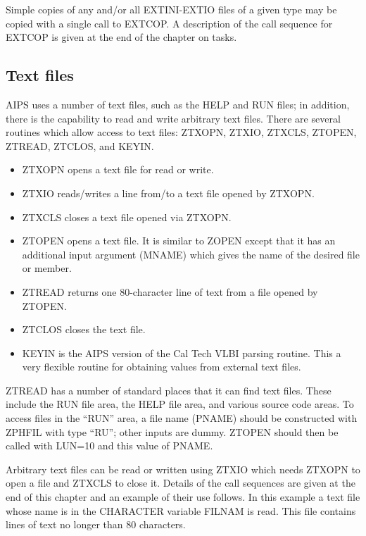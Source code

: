 Simple copies of any and/or all EXTINI-EXTIO files of a given type may
be copied with a single call to EXTCOP.  A description of the call
sequence for EXTCOP is given at the end of the chapter on tasks.


\subsection{Text files}
AIPS uses a number of text files, such as the HELP and RUN files; in
addition, there is the capability to read and write arbitrary text
files.  There are several
routines which allow access to text files: ZTXOPN, ZTXIO, ZTXCLS,
ZTOPEN, ZTREAD, ZTCLOS, and KEYIN.
\begin{itemize} %
\item ZTXOPN opens a text file for read or write.
\item ZTXIO reads/writes a line from/to a text file opened by ZTXOPN.
\item ZTXCLS closes a text file opened via ZTXOPN.
\item ZTOPEN opens a text file.  It is similar to ZOPEN except that it has
an additional input argument (MNAME) which gives the name of the
desired file or member.
\item ZTREAD returns one 80-character line of text from a file opened
by ZTOPEN.
\item ZTCLOS closes the text file.
\item KEYIN is the AIPS version of the Cal Tech VLBI parsing routine.  This
a very flexible routine for obtaining values from external text files.

\end{itemize} %
ZTREAD has a number of standard places that it can find
text files. These include the RUN file area, the HELP file area, and
various source code areas.  To access files in the ``RUN'' area,
a file name (PNAME) should be constructed with ZPHFIL with
type ``RU''; other inputs are dummy.  ZTOPEN should then be called with
LUN=10 and this value of PNAME.

Arbitrary text files can be read or written using ZTXIO which needs
ZTXOPN to open a file and ZTXCLS to close it.  Details of the call
sequences are given at the end of this chapter and an example of their
use follows.  In this example a text file whose name is in the
CHARACTER variable FILNAM is read.  This file contains lines of text
no longer than 80 characters.

